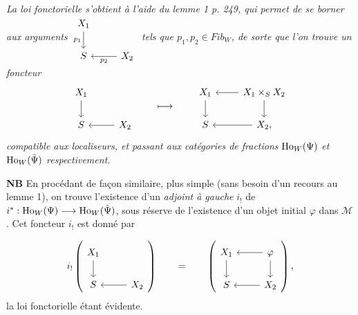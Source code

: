 
\textit{La loi fonctorielle s'obtient à l'aide du lemme 1 p. 249, qui permet de se borner aux arguments $\begin{tikzcd}[ampersand replacement=\&] X_1 \arrow[d, "p_1"'] \& \\ S \& X_2 \arrow[l, "p_2"] \end{tikzcd}$ tels que $p_1,p_2\in \mathit{Fib}_W$, de sorte que l'on trouve un foncteur}
\[
\begin{tikzcd}[ampersand replacement=\&]
X_1 \arrow[d] \& \\
S \& X_2 \arrow[l]
\end{tikzcd}
\qquad\longmapsto\qquad
\begin{tikzcd}[ampersand replacement=\&]
X_1 \arrow[d] \& X_1\times_S X_2 \arrow[l] \arrow[d] \\
S \& X_2, \arrow[l]
\end{tikzcd}
\]
\textit{compatible aux localiseurs, et passant aux catégories de fractions} $\mathrm{Ho}_W(\Psi)$ \textit{et} $\mathrm{Ho}_W(\tilde{\Psi})$ \textit{respectivement.}

\textbf{NB} En procédant de façon similaire, plus simple (sans besoin d'un recours au lemme 1), on trouve l'existence d'un \textit{adjoint à gauche} $i_!$ de $i^* : \mathrm{Ho}_W(\Psi)\longrightarrow \mathrm{Ho}_W(\tilde{\Psi})$, sous réserve de l'existence d'un objet initial $\varphi$ dans $\mathcal{M}$. Cet foncteur $i_!$ est donné par %

\[
i_!\left(
\begin{tikzcd}[ampersand replacement=\&]
X_1 \arrow[d] \& \\
S \& X_2 \arrow[l]
\end{tikzcd}
\right)
\qquad = \qquad
\left(
\begin{tikzcd}[ampersand replacement=\&]
X_1 \arrow[d] \& \varphi \arrow[l] \arrow[d] \\
S \& X_2 \arrow[l]
\end{tikzcd}
\right),
\]
la loi fonctorielle étant évidente.

